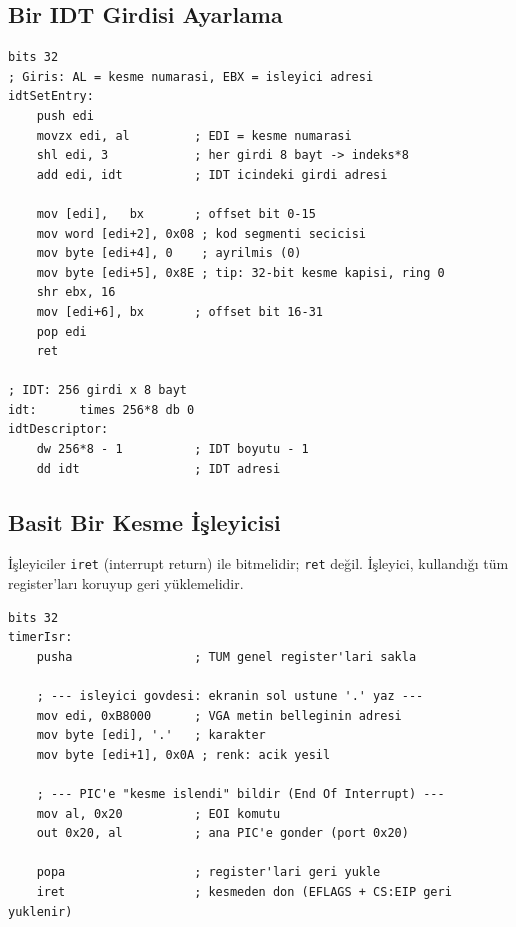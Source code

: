\documentclass[11pt,a4paper]{article}
\newcommand{\kod}[1]{\texttt{\color{koyuGri}#1}}
\begin{document}
\subsection{Bir IDT Girdisi Ayarlama}

\begin{ornekkutu}
\begin{lstlisting}
bits 32
; Giris: AL = kesme numarasi, EBX = isleyici adresi
idtSetEntry:
    push edi
    movzx edi, al         ; EDI = kesme numarasi
    shl edi, 3            ; her girdi 8 bayt -> indeks*8
    add edi, idt          ; IDT icindeki girdi adresi

    mov [edi],   bx       ; offset bit 0-15
    mov word [edi+2], 0x08 ; kod segmenti secicisi
    mov byte [edi+4], 0    ; ayrilmis (0)
    mov byte [edi+5], 0x8E ; tip: 32-bit kesme kapisi, ring 0
    shr ebx, 16
    mov [edi+6], bx       ; offset bit 16-31
    pop edi
    ret

; IDT: 256 girdi x 8 bayt
idt:      times 256*8 db 0
idtDescriptor:
    dw 256*8 - 1          ; IDT boyutu - 1
    dd idt                ; IDT adresi
\end{lstlisting}
\end{ornekkutu}

\subsection{Basit Bir Kesme İşleyicisi}

İşleyiciler \kod{iret} (interrupt return) ile bitmelidir; \kod{ret} değil.
İşleyici, kullandığı tüm register'ları koruyup geri yüklemelidir.

\begin{ornekkutu}
\begin{lstlisting}
bits 32
timerIsr:
    pusha                 ; TUM genel register'lari sakla

    ; --- isleyici govdesi: ekranin sol ustune '.' yaz ---
    mov edi, 0xB8000      ; VGA metin belleginin adresi
    mov byte [edi], '.'   ; karakter
    mov byte [edi+1], 0x0A ; renk: acik yesil

    ; --- PIC'e "kesme islendi" bildir (End Of Interrupt) ---
    mov al, 0x20          ; EOI komutu
    out 0x20, al          ; ana PIC'e gonder (port 0x20)

    popa                  ; register'lari geri yukle
    iret                  ; kesmeden don (EFLAGS + CS:EIP geri yuklenir)
\end{lstlisting}
\end{ornekkutu}
\end{document}
